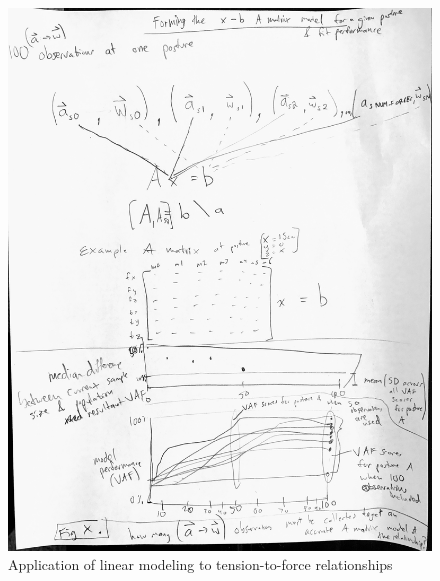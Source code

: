 \documentclass[utf8]{frontiersSCNS} %
\begin{document}
\begin{figure}[h!]
\begin{center}
\includegraphics[width=17.5cm]{figures/creating_A_matrix/creating_A_matrix.jpg}%
\end{center}
\caption{Application of linear modeling to tension-to-force relationships }
\label{fig:creating_A_matrix}
\end{figure}
\end{document}
